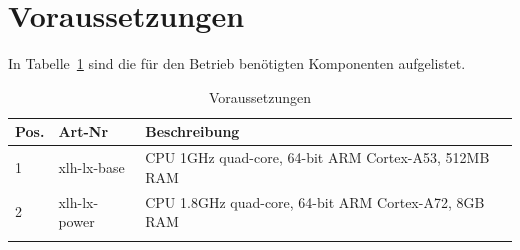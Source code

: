 \documentclass[10pt]{datasheet}
\begin{document}
\section{Voraussetzungen}
In Tabelle~\ref{tab:voraussetzungen} sind die für den Betrieb benötigten Komponenten aufgelistet.

\begin{table}[h]
\begin{threeparttable}
\caption{Voraussetzungen \xlhPlattformID}
    \begin{tabularx}{\textwidth}{l | l | l }
        \thickhline
        \textbf{Pos.} & \textbf{Art-Nr} & \textbf{Beschreibung} \\
        \hline
        1 & xlh-lx-base & CPU 1GHz quad-core, 64-bit ARM Cortex-A53, 512MB RAM \\
        2 & xlh-lx-power & CPU 1.8GHz quad-core, 64-bit ARM Cortex-A72, 8GB RAM \\
        \thickhline
    \end{tabularx}

\label{tab:voraussetzungen}
\end{threeparttable}
\end{table}
\end{document}
